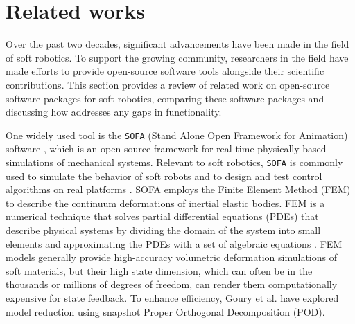 \section{Related works}
\label{sec:C5:related_works}
Over the past two decades, significant advancements have been made in the field of soft robotics. To support the growing community, researchers in the field have made efforts to provide open-source software tools alongside their scientific contributions. This section provides a review of related work on open-source software packages for soft robotics, comparing these software packages and discussing how \sorotoki addresses any gaps in functionality.

One widely used tool is the \texttt{SOFA} (Stand Alone Open Framework for Animation) software \cite{Duriez2013}, which is an open-source framework for real-time physically-based simulations of mechanical systems. Relevant to soft robotics, \texttt{SOFA} is commonly used to simulate the behavior of soft robots and to design and test control algorithms on real platforms \cite{Duriez2013, Coevoet2017}. SOFA employs the Finite Element Method (FEM) to describe the continuum deformations of inertial elastic bodies. FEM is a numerical technique that solves partial differential equations (PDEs) that describe physical systems by dividing the domain of the system into small elements and approximating the PDEs with a set of algebraic equations \cite{Kim2018,Holzapfel2002}. FEM models generally provide high-accuracy volumetric deformation simulations of soft materials, but their high state dimension, which can often be in the thousands or millions of degrees of freedom, can render them computationally expensive for state feedback. To enhance efficiency, Goury et al. \cite{Goury2018} have explored model reduction using snapshot Proper Orthogonal Decomposition (POD).

